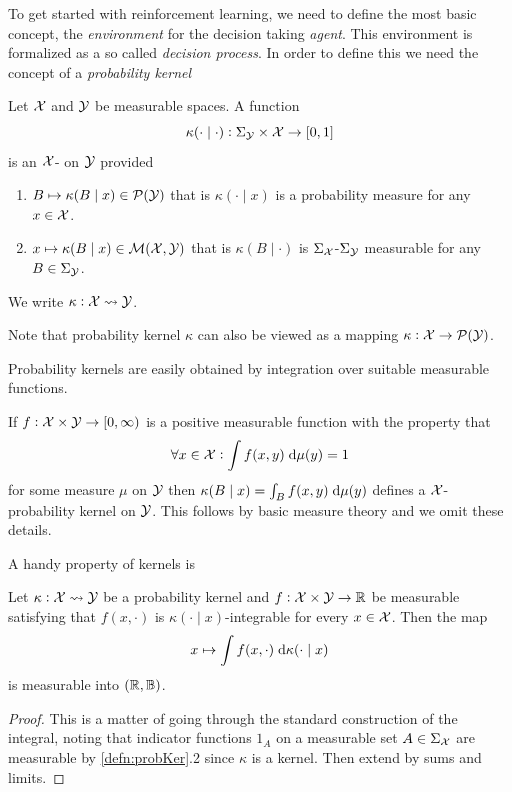 


To get started with reinforcement learning,
we need to define the most basic concept, the
\emph{environment} for the decision taking \emph{agent}.
This environment is formalized as a so called \emph{decision process}.
In order to define this we need the concept of a \emph{probability kernel}

\begin{defn}
  Let $\mathcal{X}$ and $\mathcal{Y}$ be measurable spaces.
  A function
  \[ \kappa(\cdot \mid \cdot) : \Sigma_\mathcal{Y} \times \mathcal{X} \to [0,1] \]
  is an $\mathcal{X}$-
  on $\mathcal{Y}$ provided
  \begin{enumerate}
    \item $B \mapsto \kappa(B \mid x) \in \mathcal{P}(\mathcal{Y})$
      that is $\kappa(\cdot \mid x)$ is a probability measure
      for any $x \in \mathcal{X}$.
    \item
      $x \mapsto \kappa(B \mid x) \in \mathcal{M}(\mathcal{X}, \mathcal{Y})$
      that is $\kappa(B \mid \cdot)$ is $\Sigma_\mathcal{X}$-$\Sigma_\mathcal{Y}$
      measurable for any $B \in \Sigma_\mathcal{Y}$.
  \end{enumerate}
  We write $\kappa : \mathcal{X} \leadsto \mathcal{Y}$.
  \label{defn:probKer}
\end{defn}
\begin{rem}
  Note that probability kernel $\kappa$ can also be viewed as a mapping
  $\kappa : \mathcal{X} \to \mathcal{P}(\mathcal{Y})$.
\end{rem}

Probability kernels are easily obtained by integration over suitable
measurable functions.

\begin{example}
  If $f : \mathcal{X} \times \mathcal{Y} \to [0,\infty)$
  is a positive measurable function with the property that
  \[ \forall x \in \mathcal{X} : \int f(x, y) \; \mathrm{d} \mu(y) = 1 \]
  for some measure $\mu$ on $\mathcal{Y}$
  then $\kappa(B \mid x) = \int_B f(x, y) \; \mathrm{d} \mu(y)$ defines a
  $\mathcal{X}$-probability kernel on $\mathcal{Y}$.
  This follows by basic measure theory and we omit these details.
\end{example}

A handy property of kernels is
\begin{prop}
  Let $\kappa : \mathcal{X} \leadsto \mathcal{Y}$ be a probability kernel
  and $f : \mathcal{X} \times \mathcal{Y} \to \mathbb{R}$ be measurable satisfying
  that $f(x, \cdot)$ is $\kappa(\cdot \mid x)$-integrable for every $x \in \mathcal{X}$.
  Then the map
  \[ x \mapsto \int f(x, \cdot) \; \mathrm{d} \kappa(\cdot \mid x)\]
  is measurable into $(\mathbb{R}, \mathbb{B})$.
  \label{prop:intKerMeas}
\end{prop}
\begin{proof}
  This is a matter of going through the standard construction of the integral,
  noting that indicator functions $1_A$ on a measurable set $A \in \Sigma_\mathcal{X}$
  are measurable by \cref{defn:probKer}.2 since $\kappa$ is a kernel.
  Then extend by sums and limits.
\end{proof}

